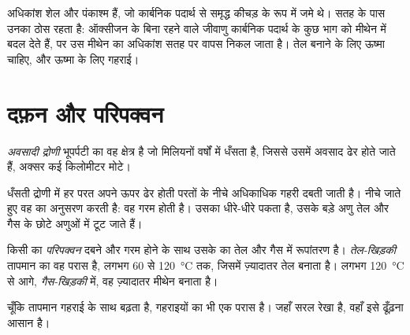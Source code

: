 अधिकांश  शेल और पंकाश्म हैं, जो कार्बनिक पदार्थ से समृद्ध कीचड़ के रूप में
जमे थे। सतह के पास उनका  ठोस रहता है: ऑक्सीजन के बिना
रहने वाले जीवाणु कार्बनिक पदार्थ के कुछ भाग को मीथेन में बदल देते हैं, पर उस मीथेन का
अधिकांश सतह पर वापस निकल जाता है। तेल बनाने के लिए ऊष्मा चाहिए, और ऊष्मा के लिए गहराई।

\section{दफ़न और परिपक्वन}

\begin{definition}[अवसादी द्रोणी]\label{def:g11:fossil-fuel-geology:basin}
\emph{अवसादी द्रोणी} भूपर्पटी का वह क्षेत्र है
जो मिलियनों वर्षों में धँसता है, जिससे उसमें अवसाद ढेर होते जाते हैं, अक्सर
कई किलोमीटर मोटे।
\end{definition}

धँसती द्रोणी में हर परत अपने ऊपर ढेर होती परतों के नीचे अधिकाधिक गहरी
दबती जाती है। नीचे जाते हुए वह  का अनुसरण करती है: वह
गरम होती है। उसका  धीरे-धीरे पकता है, उसके बड़े अणु तेल और गैस के
छोटे अणुओं में टूट जाते हैं।

\begin{definition}[परिपक्वन; तेल-खिड़की; गैस-खिड़की]\label{def:g11:fossil-fuel-geology:oil-window}
किसी  का \emph{परिपक्वन} दबने और गरम होने के साथ उसके
 का तेल और गैस में रूपांतरण है।
\emph{तेल-खिड़की} तापमान का वह परास है, लगभग
60 से \qty{120}{\degreeCelsius} तक, जिसमें  ज़्यादातर तेल बनाता है।
लगभग \qty{120}{\degreeCelsius} से आगे, \emph{गैस-खिड़की} में,
वह ज़्यादातर मीथेन बनाता है।
\end{definition}

चूँकि तापमान गहराई के साथ बढ़ता है,  गहराइयों का भी एक परास है।
जहाँ  सरल रेखा है, वहाँ इसे ढूँढ़ना आसान है।

